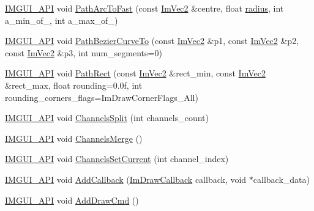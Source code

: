 \begin{DoxyCompactItemize}
\item 
\mbox{\hyperlink{imgui_8h_a43829975e84e45d1149597467a14bbf5}{I\+M\+G\+U\+I\+\_\+\+A\+PI}} void \mbox{\hyperlink{struct_im_draw_list_a713cca3862e88aa1ee671db1c4cf6bdb}{Path\+Arc\+To\+Fast}} (const \mbox{\hyperlink{struct_im_vec2}{Im\+Vec2}} \&centre, float \mbox{\hyperlink{graphics_8cpp_a5050a760c11da521cd4aee6336f6529f}{radius}}, int a\+\_\+min\+\_\+of\+\_, int a\+\_\+max\+\_\+of\+\_)
\item 
\mbox{\hyperlink{imgui_8h_a43829975e84e45d1149597467a14bbf5}{I\+M\+G\+U\+I\+\_\+\+A\+PI}} void \mbox{\hyperlink{struct_im_draw_list_a495ca7dd4fd5a898e2414658321f4b18}{Path\+Bezier\+Curve\+To}} (const \mbox{\hyperlink{struct_im_vec2}{Im\+Vec2}} \&p1, const \mbox{\hyperlink{struct_im_vec2}{Im\+Vec2}} \&p2, const \mbox{\hyperlink{struct_im_vec2}{Im\+Vec2}} \&p3, int num\+\_\+segments=0)
\item 
\mbox{\hyperlink{imgui_8h_a43829975e84e45d1149597467a14bbf5}{I\+M\+G\+U\+I\+\_\+\+A\+PI}} void \mbox{\hyperlink{struct_im_draw_list_a6664e5392e7cca67fd95c4dc0eae7569}{Path\+Rect}} (const \mbox{\hyperlink{struct_im_vec2}{Im\+Vec2}} \&rect\+\_\+min, const \mbox{\hyperlink{struct_im_vec2}{Im\+Vec2}} \&rect\+\_\+max, float rounding=0.\+0f, int rounding\+\_\+corners\+\_\+flags=\+Im\+Draw\+Corner\+Flags\+\_\+\+All)
\item 
\mbox{\hyperlink{imgui_8h_a43829975e84e45d1149597467a14bbf5}{I\+M\+G\+U\+I\+\_\+\+A\+PI}} void \mbox{\hyperlink{struct_im_draw_list_a426f124ba049bed2d38c850c65f9f917}{Channels\+Split}} (int channels\+\_\+count)
\item 
\mbox{\hyperlink{imgui_8h_a43829975e84e45d1149597467a14bbf5}{I\+M\+G\+U\+I\+\_\+\+A\+PI}} void \mbox{\hyperlink{struct_im_draw_list_a2ed82c3f663cda520c90c55b94196274}{Channels\+Merge}} ()
\item 
\mbox{\hyperlink{imgui_8h_a43829975e84e45d1149597467a14bbf5}{I\+M\+G\+U\+I\+\_\+\+A\+PI}} void \mbox{\hyperlink{struct_im_draw_list_a7de44b9fdfce65f32063ecad9306a191}{Channels\+Set\+Current}} (int channel\+\_\+index)
\item 
\mbox{\hyperlink{imgui_8h_a43829975e84e45d1149597467a14bbf5}{I\+M\+G\+U\+I\+\_\+\+A\+PI}} void \mbox{\hyperlink{struct_im_draw_list_a14073d60ef9db9dc663dc7717a4893a5}{Add\+Callback}} (\mbox{\hyperlink{imgui_8h_a232a477233f9e3ab7640720bf94674de}{Im\+Draw\+Callback}} callback, void $\ast$callback\+\_\+data)
\item 
\mbox{\hyperlink{imgui_8h_a43829975e84e45d1149597467a14bbf5}{I\+M\+G\+U\+I\+\_\+\+A\+PI}} void \mbox{\hyperlink{struct_im_draw_list_a846714bb0321c6f1f908767abc8559e6}{Add\+Draw\+Cmd}} ()

\end{DoxyCompactItemize}
